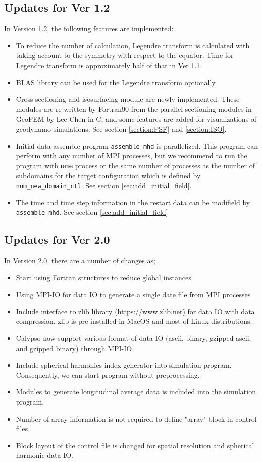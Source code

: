 \subsection{Updates for Ver 1.2}
In Version 1.2, the following features are implemented:
\begin{itemize}
\item To reduce the number of calculation, Legendre transform is calculated with taking account to the symmetry with respect to the equator. Time for Legendre transform is approximately half of that in Ver 1.1.
\item BLAS library can be used for the Legendre transform optionally.
\item Cross sectioning and isosurfacing module are newly implemented. These modules are re-written by Fortran90 from the parallel sectioning modules in GeoFEM by Lee Chen in C, and some features are added for visualizations of geodynamo simulations. See section \ref{section:PSF} and \ref{section:ISO}.
\item Initial data assemble program \verb|assemble_mhd| is parallelized. This program can perform with any number of MPI processes, but we recommend to run the program with {\bf one} process or the same number of processes as the number of subdomains for the target configuration which is defined by \verb|num_new_domain_ctl|. See section \ref{sec:add_initial_field}.
\item The time and time step information in the restart data can be modifield by  \verb|assemble_mhd|. See section \ref{sec:add_initial_field}
\end{itemize}

\subsection{Updates for Ver 2.0}
In Version 2.0, there are a number of changes as;
\begin{itemize}
\item Start using Fortran structures to reduce global instances.
\item Using MPI-IO for data IO to generate a single date file from MPI processes
\item Include interface to zlib library (\url{https://www.zlib.net}) for data IO with data compression. zlib is pre-installed in MacOS and most of Linux distributions.
\item Calypso now support various format of data IO (ascii, binary, gzipped ascii, and gzipped binary) through MPI-IO.
\item Include spherical harmonics index generator into simulation program. Consequently, we can start program without preprocessing.
\item Modules to generate longitudinal average data is included into the simulation program.
\item Number of array information is not required to define "array" block in control files.
\item Block layout of the control file is changed for spatial resolution and spherical harmonic data IO.
\end{itemize}






